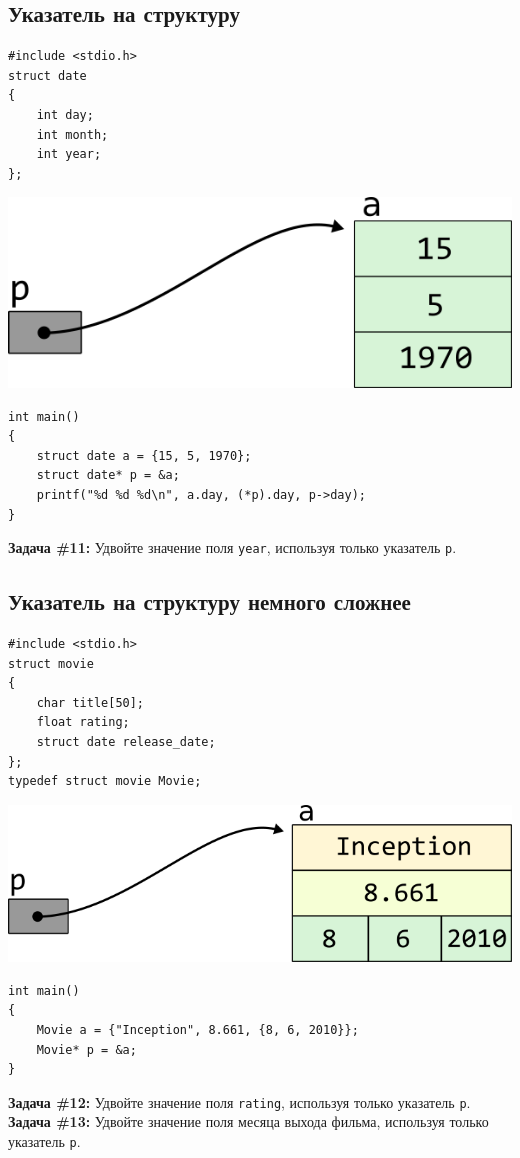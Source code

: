\documentclass{article}
\begin{document}
\subsection*{Указатель на структуру}
\begin{multicols}{2}
\begin{lstlisting}
#include <stdio.h>
struct date
{
	int day;
	int month;
	int year;
};
\end{lstlisting}
\columnbreak
\includegraphics[scale=1]{../../images/pointer_schemes/pointer_to_struct_date.png}
\end{multicols}
\vspace{-5ex}
\begin{lstlisting}
int main()
{
	struct date a = {15, 5, 1970};
	struct date* p = &a;
	printf("%d %d %d\n", a.day, (*p).day, p->day);
}
\end{lstlisting}
\textbf{Задача \#11:} Удвойте значение поля \texttt{year}, используя только указатель \texttt{p}.

\subsection*{Указатель на структуру немного сложнее}
\begin{multicols}{2}
\begin{lstlisting}
#include <stdio.h>
struct movie
{
    char title[50];
    float rating;
    struct date release_date;
};
typedef struct movie Movie;
\end{lstlisting}
\columnbreak
\begin{center}
\includegraphics[scale=1]{../../images/pointer_schemes/pointer_to_struct_movie.png}
\end{center}
\end{multicols}
\begin{lstlisting}
int main()
{
	Movie a = {"Inception", 8.661, {8, 6, 2010}};
	Movie* p = &a;
}
\end{lstlisting}
\textbf{Задача \#12:} Удвойте значение поля \texttt{rating}, используя только указатель \texttt{p}.\\
\textbf{Задача \#13:} Удвойте значение поля месяца выхода фильма, используя только указатель \texttt{p}.
\end{document}
